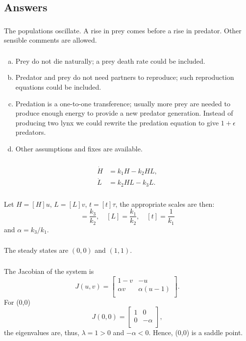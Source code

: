 \documentclass[]{article}
\newcommand{\bb}{\begin{equation}}
\newcommand{\ee}{\end{equation}}
\begin{document}
\begin{Answ}
\subsection{Answers}
\subsubsection{}
The populations oscillate. A rise in prey comes before a rise in predator. Other sensible comments are allowed.
\subsubsection{}
\begin{enumerate}[(a)]
\item Prey do not die naturally; a prey death rate could be included.
\item Predator and prey do not need partners to reproduce; such reproduction equations could be included.
\item Predation is a one-to-one transference; usually more prey are needed to produce enough energy to provide a new predator generation. Instead of producing two lynx we could rewrite the predation equation to give $1+\epsilon$ predators.
\item Other assumptions and fixes are available.
\end{enumerate}
\subsubsection{}
\begin{align}
\dot{H}&=k_1H-k_2HL,\\
\dot{L}&=k_2HL-k_3L.
\end{align}
\subsubsection{}
Let $H=[H]u$, $L=[L]v$, $t=[t]\tau$, the appropriate scales are then:
\bb
[H]=\frac{k_3}{k_2},\quad [L]=\frac{k_1}{k_2},\quad [t]=\frac{1}{k_1}
\ee
and $\alpha=k_3/k_1$.
\subsubsection{}
The steady states are $(0,0)$ and $(1,1)$.
\subsubsection{}
The Jacobian of the system is
\bb
J(u,v)=\left[ {\begin{array}{cc}
   1-v & -u \\
   \alpha v & \alpha(u-1) \\
  \end{array} } \right].
\ee
For (0,0)
\bb
J(0,0)=\left[ {\begin{array}{cc}
   1 & 0 \\
   0 & -\alpha \\
  \end{array} } \right],
\ee
the eigenvalues are, thus, $\lambda=1>0$ and $-\alpha<0$. Hence, (0,0) is a saddle point.


\end{Answ}
\end{document}
